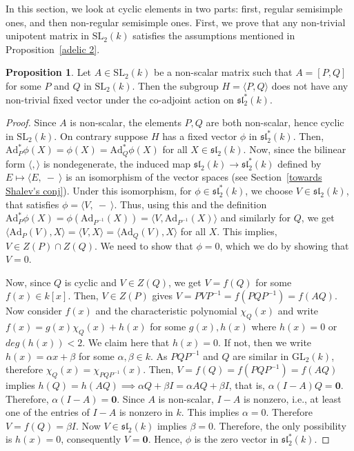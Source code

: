 \documentclass[10pt,twoside]{amsart}
\newcommand{\GL}{\mathrm{GL}}
\newcommand{\SL}{\mathrm{SL}}
\theoremstyle{definition}
\theoremstyle{definition}
\newtheorem{proposition}[theorem]{Proposition}
\begin{document}
In this section, we look at cyclic elements in two parts: first, regular semisimple ones, and then non-regular semisimple ones. First, we prove that any non-trivial unipotent matrix in $\SL_2(k)$ satisfies the assumptions mentioned in Proposition~\ref{adelic 2}.
\begin{proposition}{\label{fixed vector 2}}
Let $A\in \SL_2(k)$ be a non-scalar matrix such that $A = [P, Q]$ for some $P$ and $Q$ in $\SL_2(k)$. Then the subgroup $H=\langle P, Q\rangle$ does not have any non-trivial fixed vector under the co-adjoint action on $\mathfrak{sl}_2^*(k)$. 
\end{proposition}
\begin{proof}
Since $A$ is non-scalar, the elements $P, Q$ are both non-scalar, hence cyclic in $\SL_2(k)$. On contrary suppose $H$ has a fixed vector $\phi$ in $\mathfrak{sl}_2^*(k)$. Then, $\mathrm{Ad}_P^*\phi(X)= \phi(X) = \mathrm{Ad}_Q^*\phi(X)$ for all $X\in \mathfrak{sl}_2(k)$. Now, since the bilinear form $\langle, \rangle$ is nondegenerate, the induced map $ \mathfrak{sl}_2(k) \rightarrow \mathfrak{sl}_2^*(k)$ defined by $E\mapsto \langle E,\ -\ \rangle$ is an isomorphism of the vector spaces (see Section~\ref{towards Shalev's conj}). Under this isomorphism, for $\phi\in \mathfrak{sl}_2^*(k)$, we choose $V\in \mathfrak{sl}_2(k)$, that satisfies $\phi = \langle V,\ -\ \rangle$. Thus, using this and the definition $\mathrm{Ad}_P^*\phi(X) = \phi(\mathrm{Ad}_{P^{-1}}(X)) = \langle V, \mathrm{Ad}_{P^{-1}}(X)\rangle$ and similarly for $Q$, we get $\langle \mathrm{Ad}_P(V), X\rangle = \langle V, X \rangle = \langle \mathrm{Ad}_Q(V), X\rangle$ for all $X$. This implies,  $V\in Z(P)\cap Z(Q)$. We need to show that $\phi = 0$, which we do by showing that $V=0$.
 
Now, since $Q$ is cyclic and $V\in Z(Q)$, we get $V = f(Q)$ for some $f(x)\in k[x]$. Then, $V\in Z(P)$ gives $V = PVP^{-1} = f(PQP^{-1}) = f(AQ)$. Now consider $f(x)$ and the characteristic polynomial $\chi_Q(x)$ and write $f(x)= g(x)\chi_Q(x) + h(x)$ for some $g(x), h(x)$ where $h(x)=0$ or $deg(h(x)) < 2$. We claim here that $h(x)=0$. If not, then we write $h(x) = \alpha x + \beta$ for some $\alpha, \beta \in k$. As $PQP^{-1}$ and $Q$ are similar in $\GL_2(k)$, therefore $\chi_Q(x) = \chi_{PQP^{-1}}(x)$.  Then, $V= f(Q) = f(PQP^{-1})=f(AQ)$ implies $ h(Q) = h(AQ) \implies \alpha Q + \beta I = \alpha AQ + \beta I$, that is, $\alpha(I-A)Q=\mathbf{0}$. Therefore, $\alpha (I-A)=\mathbf{0}$. Since $A$ is non-scalar, $I-A$ is nonzero, i.e., at least one of the entries of $I-A$ is nonzero in $k$. This implies $\alpha = 0$. Therefore $V= f(Q) = \beta I$. Now $V\in \mathfrak{sl}_2(k)$ implies $\beta=0$. Therefore, the only possibility is $h(x)=0$, consequently $V = \mathbf{0}$. Hence, $\phi$ is the zero vector in $\mathfrak{sl}_2^*(k)$.
\end{proof}
\end{document}
